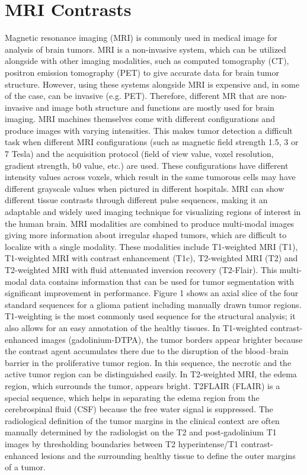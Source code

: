 \section{MRI Contrasts}
Magnetic resonance imaging (MRI) is commonly used in medical image for analysis of brain tumors. MRI is a non-invasive system, which can be utilized alongside with other imaging modalities, such as computed tomography (CT), positron emission tomography (PET) to give accurate data for brain tumor structure. However, using these systems alongside MRI is expensive and, in some of the case, can be invasive (e.g. PET). Therefore, different MR that are non-invasive and image both structure and functions are mostly used for brain imaging. MRI machines themselves come with different configurations and produce images with varying intensities. This makes tumor detection a difficult task when different MRI configurations (such as magnetic field strength 1.5, 3 or 7 Tesla) and the acquisition protocol (field of view value, voxel resolution, gradient strength, b0 value, etc.) are used. These configurations have different intensity values across voxels, which result in the same tumorous cells may have different grayscale values when pictured in different hospitals. MRI can show different tissue contrasts through different pulse sequences, making it an adaptable and widely used imaging technique for visualizing regions of interest in the human brain. MRI modalities are combined to produce multi-modal images giving more information about irregular shaped tumors, which are difficult to localize with a single modality. These modalities include T1-weighted MRI (T1), T1-weighted MRI with contrast enhancement (T1c), T2-weighted MRI (T2) and T2-weighted MRI with fluid attenuated inversion recovery (T2-Flair). This multi-modal data contains information that can be used for tumor segmentation with significant improvement in performance. Figure 1 shows an axial slice of the four standard sequences for a glioma patient including manually drawn tumor regions. T1-weighting is the most commonly used sequence for the structural analysis; it also allows for an easy annotation of the healthy tissues. In T1-weighted contrast-enhanced images (gadolinium-DTPA), the tumor borders appear brighter because the contrast agent accumulates there due to the disruption of the blood–brain barrier in the proliferative tumor region. In this sequence, the necrotic and the active tumor region can be distinguished easily. In T2-weighted MRI, the edema region, which surrounds the tumor, appears bright. T2FLAIR (FLAIR) is a special sequence, which helps in separating the edema region from the cerebrospinal fluid (CSF) because the free water signal is suppressed. The radiological definition of the tumor margins in the clinical context are often manually determined by the radiologist on the T2 and post-gadolinium T1 images by thresholding boundaries between T2 hyperintense/T1 contrast-enhanced lesions and the surrounding healthy tissue to define the outer margins of a tumor.

